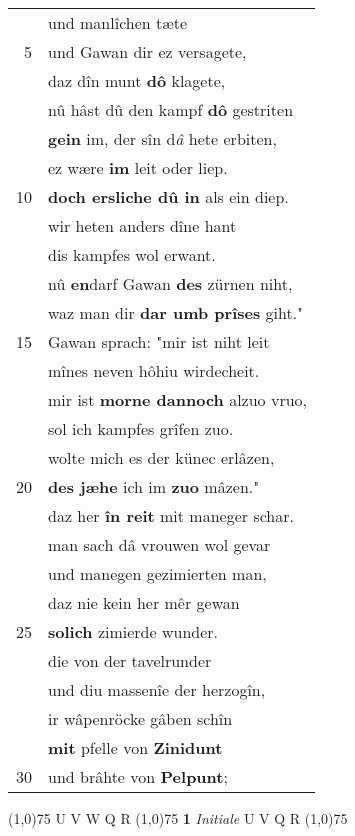 \documentclass[8pt,a4paper,notitlepage]{article}
\begin{document}
\begin{table}[ht]
\begin{minipage}[t]{0.5\linewidth}
\begin{tabular}{rl}
 & und manlîchen tæte\\ 
5 & und Gawan dir ez versagete,\\ 
 & daz dîn munt \textbf{dô} klagete,\\ 
 & nû hâst dû den kampf \textbf{dô} gestriten\\ 
 & \textbf{gein} im, der sîn d\textit{â} hete erbiten,\\ 
 & ez wære \textbf{im} leit oder liep.\\ 
10 & \textbf{doch ersliche dû in} als ein diep.\\ 
 & wir heten anders dîne hant\\ 
 & dis kampfes wol erwant.\\ 
 & nû \textbf{en}darf Gawan \textbf{des} zürnen niht,\\ 
 & waz man dir \textbf{dar umb prîses} giht."\\ 
15 & Gawan sprach: "mir ist niht leit\\ 
 & mînes neven hôhiu wirdecheit.\\ 
 & mir ist \textbf{morne dannoch} alzuo vruo,\\ 
 & sol ich kampfes grîfen zuo.\\ 
 & wolte mich es der künec erlâzen,\\ 
20 & \textbf{des jæhe} ich im \textbf{zuo} mâzen."\\ 
 & daz her \textbf{în reit} mit maneger schar.\\ 
 & man sach dâ vrouwen wol gevar\\ 
 & und manegen gezimierten man,\\ 
 & daz nie kein her mêr gewan\\ 
25 & \textbf{solich} zimierde wunder.\\ 
 & die von der tavelrunder\\ 
 & und diu massenîe der herzogîn,\\ 
 & ir wâpenröcke gâben schîn\\ 
 & \textbf{mit} pfelle von \textbf{Zinidunt}\\ 
30 & und brâhte von \textbf{Pelpunt};\\ 
\end{tabular}
\scriptsize
\line(1,0){75} \newline
U V W Q R \newline
\line(1,0){75} \newline
\textbf{1} \textit{Initiale} U V Q R  \newline
\line(1,0){75} \newline

\end{minipage}
\end{table}
\end{document}
